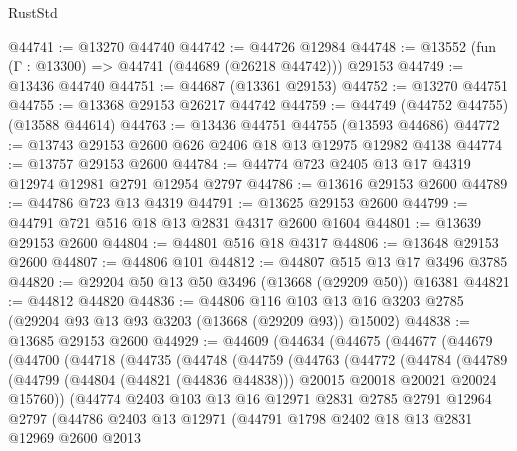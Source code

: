 \begin{lexlean}{RustStd}
\begin{coremodule}
@44741 := @13270 @44740
@44742 := @44726 @12984
@44748 := @13552 (fun (Γ : @13300) => @44741 (@44689 (@26218 @44742))) @29153
@44749 := @13436 @44740
@44751 := @44687 (@13361 @29153)
@44752 := @13270 @44751
@44755 := @13368 @29153 @26217 @44742
@44759 := @44749 (@44752 @44755) (@13588 @44614)
@44763 := @13436 @44751 @44755 (@13593 @44686)
@44772 := @13743 @29153 @2600 @626 @2406 @18 @13 @12975 @12982 @4138
@44774 := @13757 @29153 @2600
@44784 := @44774 @723 @2405 @13 @17 @4319 @12974 @12981 @2791 @12954 @2797
@44786 := @13616 @29153 @2600
@44789 := @44786 @723 @13 @4319
@44791 := @13625 @29153 @2600
@44799 := @44791 @721 @516 @18 @13 @2831 @4317 @2600 @1604
@44801 := @13639 @29153 @2600
@44804 := @44801 @516 @18 @4317
@44806 := @13648 @29153 @2600
@44807 := @44806 @101
@44812 := @44807 @515 @13 @17 @3496 @3785
@44820 := @29204 @50 @13 @50 @3496 (@13668 (@29209 @50)) @16381
@44821 := @44812 @44820
@44836 := @44806
    @116
    @103
    @13
    @16
    @3203
    @2785
    (@29204 @93 @13 @93 @3203 (@13668 (@29209 @93)) @15002)
@44838 := @13685 @29153 @2600
@44929 := @44609
    (@44634
      (@44675
        (@44677
          (@44679
            (@44700
              (@44718
                (@44735
                  (@44748
                    (@44759
                      (@44763
                        (@44772
                          (@44784
                            (@44789
                              (@44799
                                (@44804 (@44821 (@44836 @44838)))
                                @20015
                                @20018
                                @20021
                                @20024
                                @15760))
                            (@44774
                              @2403
                              @103
                              @13
                              @16
                              @12971
                              @2831
                              @2785
                              @2791
                              @12964
                              @2797
                              (@44786
                                @2403
                                @13
                                @12971
                                (@44791
                                  @1798
                                  @2402
                                  @18
                                  @13
                                  @2831
                                  @12969
                                  @2600
                                  @2013

\end{coremodule}
\end{lexlean}
